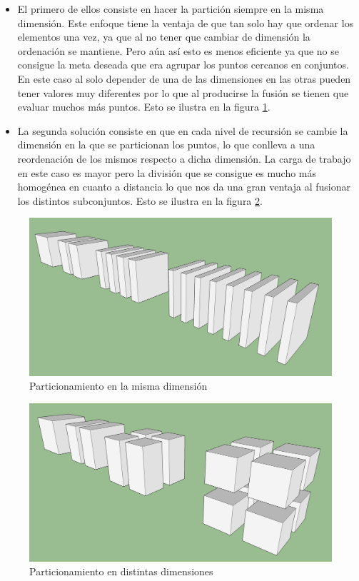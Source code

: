 \documentclass{article}
\begin{document}
		\begin{itemize}
		
			\item 
			El primero de ellos consiste en hacer la partición siempre en la misma dimensión. Este enfoque tiene la ventaja de que tan solo hay que ordenar los elementos una vez, ya que al no tener que cambiar de dimensión la ordenación se mantiene. Pero aún así esto es menos eficiente ya que no se consigue la meta deseada que era agrupar los puntos cercanos en conjuntos. En este caso al solo depender de una de las dimensiones en las otras pueden tener valores muy diferentes por lo que al producirse la fusión se tienen que evaluar muchos más puntos. Esto se ilustra en la figura \ref{same_dim}. 
			
			\item 
			La segunda solución consiste en que en cada nivel de recursión se cambie la dimensión en la que se particionan los puntos, lo que conlleva a una reordenación de los mismos respecto a dicha dimensión. La carga de trabajo en este caso es mayor pero la división que se consigue es mucho más homogénea en cuanto a distancia lo que nos da una gran ventaja al fusionar los distintos subconjuntos. Esto se ilustra en la figura \ref{different_dim}. 

		\end{itemize}



	\begin{figure}[ht!]
		\centering
		\includegraphics[width=120mm]{cube_division_1.jpg}
		\caption{Particionamiento en la misma dimensión \label{same_dim}}
	\end{figure}

	\begin{figure}[ht!]
		\centering
		\includegraphics[width=120mm]{cube_division_2.jpg}
		\caption{Particionamiento en distintas dimensiones \label{different_dim}}
	\end{figure}
\end{document}

